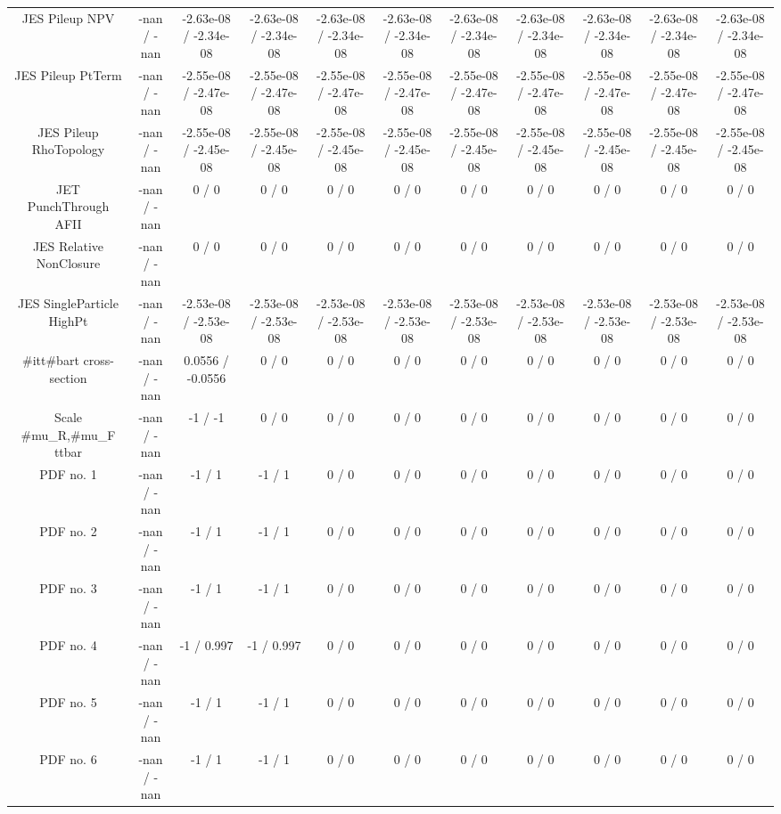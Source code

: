 \begin{table}[htbp]
\begin{center}
\begin{tabular}{|c|c|c|c|c|c|c|c|c|c|c|}
  JES Pileup NPV & -nan / -nan & -2.63e-08 / -2.34e-08 & -2.63e-08 / -2.34e-08 & -2.63e-08 / -2.34e-08 & -2.63e-08 / -2.34e-08 & -2.63e-08 / -2.34e-08 & -2.63e-08 / -2.34e-08 & -2.63e-08 / -2.34e-08 & -2.63e-08 / -2.34e-08 & -2.63e-08 / -2.34e-08 \\ 
  JES Pileup PtTerm & -nan / -nan & -2.55e-08 / -2.47e-08 & -2.55e-08 / -2.47e-08 & -2.55e-08 / -2.47e-08 & -2.55e-08 / -2.47e-08 & -2.55e-08 / -2.47e-08 & -2.55e-08 / -2.47e-08 & -2.55e-08 / -2.47e-08 & -2.55e-08 / -2.47e-08 & -2.55e-08 / -2.47e-08 \\ 
  JES Pileup RhoTopology & -nan / -nan & -2.55e-08 / -2.45e-08 & -2.55e-08 / -2.45e-08 & -2.55e-08 / -2.45e-08 & -2.55e-08 / -2.45e-08 & -2.55e-08 / -2.45e-08 & -2.55e-08 / -2.45e-08 & -2.55e-08 / -2.45e-08 & -2.55e-08 / -2.45e-08 & -2.55e-08 / -2.45e-08 \\ 
  JET PunchThrough AFII & -nan / -nan & 0 / 0 & 0 / 0 & 0 / 0 & 0 / 0 & 0 / 0 & 0 / 0 & 0 / 0 & 0 / 0 & 0 / 0 \\ 
  JES Relative NonClosure & -nan / -nan & 0 / 0 & 0 / 0 & 0 / 0 & 0 / 0 & 0 / 0 & 0 / 0 & 0 / 0 & 0 / 0 & 0 / 0 \\ 
  JES SingleParticle HighPt & -nan / -nan & -2.53e-08 / -2.53e-08 & -2.53e-08 / -2.53e-08 & -2.53e-08 / -2.53e-08 & -2.53e-08 / -2.53e-08 & -2.53e-08 / -2.53e-08 & -2.53e-08 / -2.53e-08 & -2.53e-08 / -2.53e-08 & -2.53e-08 / -2.53e-08 & -2.53e-08 / -2.53e-08 \\ 
  #it{t#bar{t}} cross-section & -nan / -nan & 0.0556 / -0.0556 & 0 / 0 & 0 / 0 & 0 / 0 & 0 / 0 & 0 / 0 & 0 / 0 & 0 / 0 & 0 / 0 \\ 
  Scale #mu_{R},#mu_{F} ttbar & -nan / -nan & -1 / -1 & 0 / 0 & 0 / 0 & 0 / 0 & 0 / 0 & 0 / 0 & 0 / 0 & 0 / 0 & 0 / 0 \\ 
  PDF no. 1 & -nan / -nan & -1 / 1 & -1 / 1 & 0 / 0 & 0 / 0 & 0 / 0 & 0 / 0 & 0 / 0 & 0 / 0 & 0 / 0 \\ 
  PDF no. 2 & -nan / -nan & -1 / 1 & -1 / 1 & 0 / 0 & 0 / 0 & 0 / 0 & 0 / 0 & 0 / 0 & 0 / 0 & 0 / 0 \\ 
  PDF no. 3 & -nan / -nan & -1 / 1 & -1 / 1 & 0 / 0 & 0 / 0 & 0 / 0 & 0 / 0 & 0 / 0 & 0 / 0 & 0 / 0 \\ 
  PDF no. 4 & -nan / -nan & -1 / 0.997 & -1 / 0.997 & 0 / 0 & 0 / 0 & 0 / 0 & 0 / 0 & 0 / 0 & 0 / 0 & 0 / 0 \\ 
  PDF no. 5 & -nan / -nan & -1 / 1 & -1 / 1 & 0 / 0 & 0 / 0 & 0 / 0 & 0 / 0 & 0 / 0 & 0 / 0 & 0 / 0 \\ 
  PDF no. 6 & -nan / -nan & -1 / 1 & -1 / 1 & 0 / 0 & 0 / 0 & 0 / 0 & 0 / 0 & 0 / 0 & 0 / 0 & 0 / 0 \\ 

\end{tabular}
\end{center}
\end{table}
